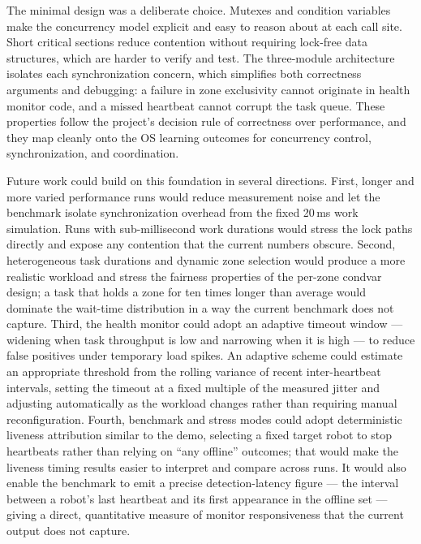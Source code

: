 \documentclass[11pt]{article}
\begin{document}
The minimal design was a deliberate choice. Mutexes and condition variables make the concurrency model explicit and easy to reason about at each call site. Short critical sections reduce contention without requiring lock-free data structures, which are harder to verify and test. The three-module architecture isolates each synchronization concern, which simplifies both correctness arguments and debugging: a failure in zone exclusivity cannot originate in health monitor code, and a missed heartbeat cannot corrupt the task queue. These properties follow the project's decision rule of correctness over performance, and they map cleanly onto the OS learning outcomes for concurrency control, synchronization, and coordination.

Future work could build on this foundation in several directions. First, longer and more varied performance runs would reduce measurement noise and let the benchmark isolate synchronization overhead from the fixed 20\,ms work simulation. Runs with sub-millisecond work durations would stress the lock paths directly and expose any contention that the current numbers obscure. Second, heterogeneous task durations and dynamic zone selection would produce a more realistic workload and stress the fairness properties of the per-zone condvar design; a task that holds a zone for ten times longer than average would dominate the wait-time distribution in a way the current benchmark does not capture. Third, the health monitor could adopt an adaptive timeout window --- widening when task throughput is low and narrowing when it is high --- to reduce false positives under temporary load spikes. An adaptive scheme could estimate an appropriate threshold from the rolling variance of recent inter-heartbeat intervals, setting the timeout at a fixed multiple of the measured jitter and adjusting automatically as the workload changes rather than requiring manual reconfiguration. Fourth, benchmark and stress modes could adopt deterministic liveness attribution similar to the demo, selecting a fixed target robot to stop heartbeats rather than relying on ``any offline'' outcomes; that would make the liveness timing results easier to interpret and compare across runs. It would also enable the benchmark to emit a precise detection-latency figure --- the interval between a robot's last heartbeat and its first appearance in the offline set --- giving a direct, quantitative measure of monitor responsiveness that the current output does not capture.
\end{document}
